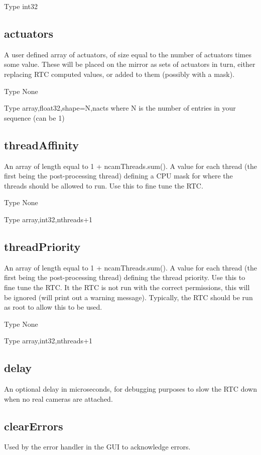 \documentclass[a4,10pt]{article}
\begin{document}
Type int32

\subsection{actuators}
A user defined array of actuators, of size equal to the number of
actuators times some value.  These will be placed on the mirror as
sets of actuators in turn, either replacing RTC
computed values, or added to them (possibly with a mask).

Type None

Type array,float32,shape=N,nacts where N is the number of entries in
your sequence (can be 1)


\subsection{threadAffinity}
An array of length equal to 1 + ncamThreads.sum().  A value for each
thread (the first being the post-processing thread) defining a CPU
mask for where the threads should be allowed to run.  Use this to fine
tune the RTC.

Type None

Type array,int32,nthreads+1

\subsection{threadPriority}
An array of length equal to 1 + ncamThreads.sum().  A value for each
thread (the first being the post-processing thread) defining the
thread priority.  Use this to fine tune the RTC.  It the RTC is not
run with the correct permissions, this will be ignored (will print
out a warning message).  Typically, the RTC should be run as root to
allow this to be used.

Type None

Type array,int32,nthreads+1



\subsection{delay}
An optional delay in microseconds, for debugging purposes to slow the
RTC down when no real cameras are attached.

\subsection{clearErrors}
Used by the error handler in the GUI to acknowledge errors.
\end{document}
